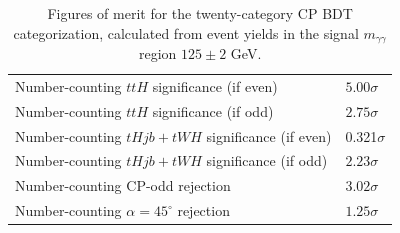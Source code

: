 \begin{table}[ht]
\begin{center}
\begin{tabular}{ll}
Number-counting $ttH$ significance (if even)& $5.00\sigma$  \\
Number-counting $ttH$ significance (if odd)& $2.75\sigma$  \\
Number-counting $tHjb + tWH$ significance (if even)& 0.321$\sigma$  \\
Number-counting $tHjb+tWH$ significance (if odd)& $2.23\sigma$  \\ \hline
Number-counting CP-odd rejection & $3.02\sigma$ \\
Number-counting $\alpha=45^\circ$ rejection & $1.25\sigma$ \\ \hline
\hline
\end{tabular}
\end{center}
\vspace{-0.5cm}
\caption{Figures of merit for the twenty-category CP BDT categorization, calculated from event yields in the signal $m_{\gamma\gamma}$ region $125\pm2$ GeV.}
\label{tab:sigs}
\end{table}
